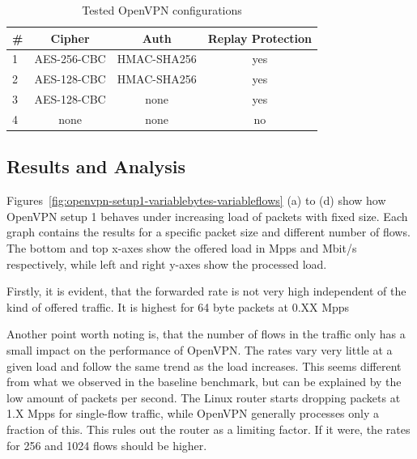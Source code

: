\documentclass[IN,11pt,twoside,openright,master,english]{tumthesis}
\begin{document}
\begin{table}
	\centering
	\begin{tabular}[htp]{lccc}
		\toprule
		\# & Cipher & Auth & Replay Protection\\
		\midrule
		1 & AES-256-CBC & HMAC-SHA256 & yes \\
		2 & AES-128-CBC & HMAC-SHA256 & yes \\
		3 & AES-128-CBC & none & yes \\
		4 & none & none & no \\
		\bottomrule
	\end{tabular}
	\caption{Tested OpenVPN configurations}
	\label{tab:openvpn-cipher-matrix}
\end{table}

\subsection{Results and Analysis}



Figures~\ref{fig:openvpn-setup1-variablebytes-variableflows} (a) to (d) show how OpenVPN setup 1 behaves under increasing load of packets with fixed size. Each graph contains the results for a specific packet size and different number of flows. 
The bottom and top x-axes show the offered load in Mpps and Mbit/s respectively, while left and right y-axes show the processed load.

Firstly, it is evident, that the forwarded rate is not very high independent of the kind of offered traffic. It is highest for 64 byte packets at 0.XX Mpps

Another point worth noting is, that the number of flows in the traffic only has a small impact on the performance of OpenVPN. The rates vary very little at a given load and follow the same trend as the load increases. This seems different from what we observed in the baseline benchmark, but can be explained by the low amount of packets per second. The Linux router starts dropping packets at 1.X Mpps for single-flow traffic, while OpenVPN generally processes only a fraction of this. This rules out the router as a limiting factor. If it were, the rates for 256 and 1024 flows should be higher.
\end{document}
